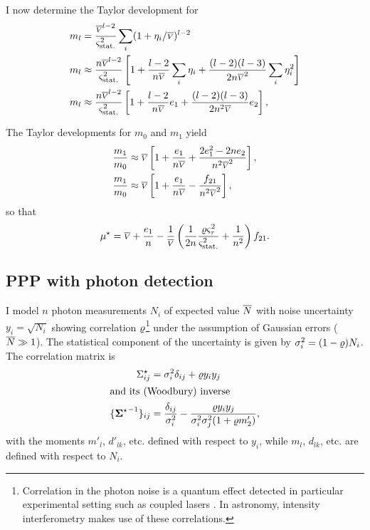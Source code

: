 \documentclass{pasa}
\begin{document}
I now determine the Taylor development for
\begin{align*}
    m_l &= \frac{\overline{{\scriptstyle V}}^{l-2}}{\varsigma_\text{stat.}^2} \sum_i (1 + \eta_i/\overline{{\scriptstyle V}})^{l-2}\\
    m_l &\approx \frac{n\overline{{\scriptstyle V}}^{l-2}}{\varsigma_\text{stat.}^2} \left[ 
                1 + \frac{l-2}{n\overline{{\scriptstyle V}}}\sum_i \eta_i 
               + \frac{(l-2)(l-3)}{2n\overline{{\scriptstyle V}}^2}\sum_i \eta_i^2\right]\\ 
    m_l &\approx \frac{n\overline{{\scriptstyle V}}^{l-2}}{\varsigma_\text{stat.}^2}\left[
            1 + \frac{l-2}{n\overline{{\scriptstyle V}}} e_1 
                + \frac{(l-2)(l-3)}{2n^2\overline{{\scriptstyle V}}} e_2 \right],
\end{align*}

The Taylor developments for $m_0$ and $m_1$ yield
\begin{align*}
   \frac{m_1}{m_0} &\approx \overline{{\scriptstyle V}}
    \left[ 1 + \frac{e_1}{n\overline{{\scriptstyle V}}} + \frac{2e_1^2 - 2n e_2}{n^2\overline{{\scriptstyle V}}^2}    \right],\\ 
   \frac{m_1}{m_0} &\approx \overline{{\scriptstyle V}}
    \left[ 1 + \frac{e_1}{n\overline{{\scriptstyle V}}} - \frac{f_{21}}{n^2\overline{{\scriptstyle V}}^2}    \right], 
\end{align*}
so that
\begin{equation*}
    \mu^\star = \overline{{\scriptstyle V}} + \frac{e_1}{n} 
                    - \frac1{\overline{{\scriptstyle V}}}
                      \left( \frac 1{2n}\frac{\varrho\varsigma_\tau^2}{\varsigma_\text{stat.}^2} + \frac 1{n^2} \right) 
                      f_{21}.
\end{equation*}

\subsection{PPP with photon detection}
\label{ap:photon}

I model $n$ photon measurements $N_i$ of expected value $\overline{N}$ with noise uncertainty $y_i = \sqrt{N_i}$ showing correlation $\varrho$\footnote{Correlation in the photon noise is a quantum effect detected in particular experimental setting such as coupled lasers \citep[e.g.][]{MAY03}.  In astronomy, intensity interferometry makes use of these correlations.}  under the assumption of Gaussian errors ($\overline{N} \gg 1$). The statistical component of the uncertainty is given by $\sigma_i^2 = (1-\varrho)N_i$. The correlation matrix is
\begin{align*}
    \Sigma^\star_{ij} &= \sigma_i^2\delta_{ij} + \varrho y_i y_j\\
\intertext{and its (Woodbury) inverse}
    \{ {\boldsymbol{\Sigma}^\star}^{-1} \}_{ij}    &= \frac{\delta_{ij}}{\sigma_i^2} 
            - \frac{\varrho y_iy_j}{\sigma_i^2\sigma_j^2(1 + \varrho m'_2)},
\end{align*}
with the moments $m'_l$, $d'_{lk}$, etc. defined with respect to $y_i$, while
$m_l$, $d_{lk}$, etc. are defined with respect to $N_i$.
\end{document}
